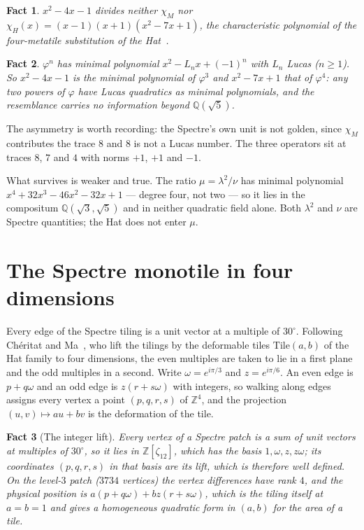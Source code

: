 \documentclass[11pt]{article}
\newtheorem{fact}{Fact}
\theoremstyle{definition}
\theoremstyle{remark}
\newcommand{\lam}{\lambda}
\begin{document}
\begin{fact}
\label{fact:goldenabsent}
$x^{2}-4x-1$ divides neither $\chi_{M}$ nor $\chi_{H}(x)=(x-1)(x+1)(x^{2}-7x+1)$, the
characteristic polynomial of the four-metatile substitution of the Hat~\cite{SmithEtAl}.
\end{fact}

\begin{fact}
\label{fact:lucas}
$\varphi^{n}$ has minimal polynomial $x^{2}-L_{n}x+(-1)^{n}$ with $L_{n}$
Lucas ($n\ge1$).  So $x^{2}-4x-1$ is the minimal polynomial of $\varphi^{3}$ and
$x^{2}-7x+1$ that of $\varphi^{4}$: any two powers of $\varphi$ have Lucas quadratics as
minimal polynomials, and the resemblance carries no information beyond
$\mathbb{Q}(\sqrt5)$.
\end{fact}

\noindent
The asymmetry is worth recording: the Spectre's own unit is not golden, since
$\chi_{M}$ contributes the trace $8$ and $8$ is not a Lucas number.  The three
operators sit at traces $8$, $7$ and $4$ with norms $+1$, $+1$ and $-1$.

What survives is weaker and true.  The ratio $\mu=\lam^{2}/\nu$ has minimal
polynomial $x^{4} + 32 x^{3} - 46 x^{2} - 32 x + 1$ --- degree four, not two --- so it lies in the compositum
$\mathbb{Q}(\sqrt3,\sqrt5)$ and in neither quadratic field alone.  Both $\lam^{2}$ and $\nu$
are Spectre quantities; the Hat does not enter $\mu$.


\section{The Spectre monotile in four dimensions}
\label{sec:lift}

Every edge of the Spectre tiling is a unit vector at a multiple of $30^{\circ}$.  Following Ch\'eritat and
Ma~\cite{CheritatMa}, who lift the tilings by the deformable tiles $\mathrm{Tile}(a,b)$ of the Hat family to four
dimensions, the even multiples are taken to lie in a first plane and the odd multiples in a second.  Write
$\omega=e^{i\pi/3}$ and $z=e^{i\pi/6}$.  An even edge is $p+q\omega$ and an odd edge is $z(r+s\omega)$ with integers, so walking
along edges assigns every vertex a point $(p,q,r,s)$ of $\mathbb{Z}^{4}$, and the projection $(u,v)\mapsto au+bv$ is
the deformation of the tile.

\begin{fact}[The integer lift]
\label{fact:lift}
Every vertex of a Spectre patch is a sum of unit vectors at multiples of $30^{\circ}$, so it lies in $\mathbb{Z}[\zeta_{12}]$,
which has the basis $1,\omega,z,z\omega$; its coordinates $(p,q,r,s)$ in that basis are its lift, which is therefore well
defined.  On the level-$3$ patch ($3734$ vertices) the vertex differences have rank $4$, and the
physical position is $a(p+q\omega)+bz(r+s\omega)$, which is the tiling itself at $a=b=1$ and gives a homogeneous quadratic
form in $(a,b)$ for the area of a tile.
\end{fact}
\end{document}
